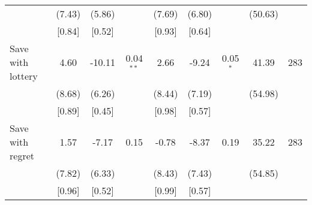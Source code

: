 \begin{table}[htbp]
{\begin{threeparttable}
\begin{tabular}{l*{8}{c}}
          &   (7.43)&   (5.86)&         &   (7.69)&   (6.80)&         &  (50.63)&         \\
          &   [0.84]&   [0.52]&         &   [0.93]&   [0.64]&         &         &         \\
Save with lottery&     4.60&   -10.11&0.04$^{**}$&     2.66&    -9.24&0.05$^{*}$&    41.39&      283\\
          &   (8.68)&   (6.26)&         &   (8.44)&   (7.19)&         &  (54.98)&         \\
          &   [0.89]&   [0.45]&         &   [0.98]&   [0.57]&         &         &         \\
Save with regret&     1.57&    -7.17&     0.15&    -0.78&    -8.37&     0.19&    35.22&      283\\
          &   (7.82)&   (6.33)&         &   (8.43)&   (7.43)&         &  (54.85)&         \\
          &   [0.96]&   [0.52]&         &   [0.99]&   [0.57]&         &         &         \\
\bottomrule \end{tabular} \begin{tablenotes}[flushleft] \footnotesize \item  \end{tablenotes} \end{threeparttable} } \end{table}
